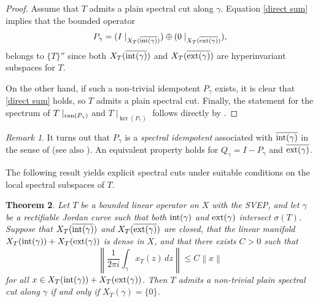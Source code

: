\documentclass[11pt]{amsart}
\newtheorem{theorem}{Theorem}[section]
\theoremstyle{definition}
\theoremstyle{remark}
\newtheorem{remark}[theorem]{Remark}
\numberwithin{equation}{section}
\newcommand{\norm}[1]{\left\|#1\right\|}
\newcommand{\ran}{\textnormal{ran}}
\newcommand{\Xint}{X_T(\overline{\inte(\gamma)})}
\newcommand{\Xext}{X_T(\overline{\exte(\gamma)})}
\newcommand{\biconm}[1]{{\{#1\}''}}
\newcommand{\inte}{\textnormal{int}}
\newcommand{\exte}{\textnormal{ext}}
\begin{document}
\begin{proof}
Assume that $T$ admits a plain spectral cut along $\gamma$. Equation \eqref{direct sum} implies that the bounded operator
$$P_\gamma = (I\mid_{X_T(\overline{\inte(\gamma)})}) \oplus(0\mid_{X_T(\overline{\exte(\gamma)})}),$$
belongs to $\biconm{T}$ since both $X_T(\overline{\inte(\gamma)})$ and $X_T(\overline{\exte(\gamma)})$ are hyperinvariant subspaces for $T$.

\smallskip

On the other hand, if such a non-trivial idempotent $P_\gamma$ exists, it is clear that \eqref{direct sum} holds, so $T$ admits a plain spectral cut. Finally, the statement for the spectrum of $T\mid_{\ran(P_\gamma)}$ and $T\mid_{\ker(P_\gamma)}$ follows directly by \cite[Proposition 1.2.20]{LN00}.
\end{proof}


\begin{remark}\label{remark 1}
It turns out that $P_\gamma$ is a \textit{spectral idempotent} associated with $\overline{\inte(\gamma)}$ in the sense of \cite{FJKP11} (see also \cite[Definition 3.1]{GG2}). An equivalent property holds for $Q_\gamma= I-P_\gamma$ and $\overline{\exte(\gamma)}$.
\end{remark}

\smallskip

The following result yields explicit spectral cuts under suitable conditions on the local spectral subspaces of $T$.

\smallskip


\begin{theorem}\label{teorema plain spectral cut local resolvent}
Let $T$ be a bounded linear operator on $X$ with the SVEP, and let $\gamma$ be a rectifiable Jordan curve such that both $\inte(\gamma)$ and $\exte(\gamma)$ intersect $\sigma(T)$. Suppose that $\Xint$ and $\Xext$ are closed, that the linear manifold $X_T(\inte(\gamma)) + X_T(\exte(\gamma))$ is dense in $X$, and that there exists $C>0$ such that
\begin{equation}\label{acotacion norma x_T}
    \norm{\frac{1}{2\pi i}\int_\gamma x_T(z)\,dz} \le C\norm{x}
\end{equation}
for all $x \in X_T(\inte(\gamma)) + X_T(\exte(\gamma))$. Then $T$ admits a non-trivial plain spectral cut along $\gamma$ if and only if $X_T(\gamma)=\{0\}$.
\end{theorem}

\smallskip
\end{document}
